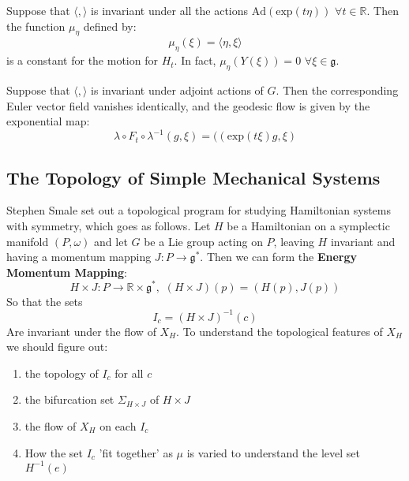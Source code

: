 \begin{prop}

Suppose that $\langle , \rangle$ is invariant under all the actions $\mathrm{Ad}(\mathrm{exp}(t\eta)) \hspace{4pt} \forall t \in \mathbb{R}$. Then the function $\mu_{\eta}$ defined by:
\begin{equation}
\mu_{\eta}(\xi) = \langle \eta, \xi \rangle
\end{equation}
is a constant for the motion for $H_t$. In fact, $\mu_{\eta}(Y(\xi))=0 \hspace{4pt} \forall \xi \in \mathfrak{g}$.
\end{prop}

\begin{cor}
Suppose that $\langle, \rangle$ is invariant under adjoint actions of $G$. Then the corresponding Euler vector field vanishes identically, and the geodesic flow is given by the exponential map:
\begin{equation}\lambda \circ F_t \circ \lambda^{-1} (g, \xi) = ((\mathrm{exp}(t\xi)g,\xi)\end{equation}
\end{cor}

\subsection{The Topology of Simple Mechanical Systems}

Stephen Smale set out a topological program for studying Hamiltonian systems with symmetry, which goes as follows. Let $H$ be a Hamiltonian on a symplectic manifold $(P,\omega)$ and let $G$ be a Lie group acting on $P$, leaving $H$ invariant and having a momentum mapping $J:P \to \mathfrak{g}^*$. Then we can form the \textbf{Energy Momentum Mapping}:
\begin{equation}H \times J: P \to \mathbb{R} \times \mathfrak{g}^*, \hspace{4pt} (H \times J)(p) = (H(p),J(p))\end{equation}
So that the sets 
\begin{equation}I_c = (H \times J)^{-1}(c)\end{equation}
Are invariant under the flow of $X_H$. To understand the topological features of $X_H$ we should figure out:
\begin{enumerate}
    \item the topology of $I_c$ for all $c$
    \item the bifurcation set $\Sigma_{H \times J}$ of $H \times J$
    \item the flow of $X_H$ on each $I_c$
    \item How the set $I_c$ 'fit together' as $\mu$ is varied to understand the level set $H^{-1}(e)$
\end{enumerate}

